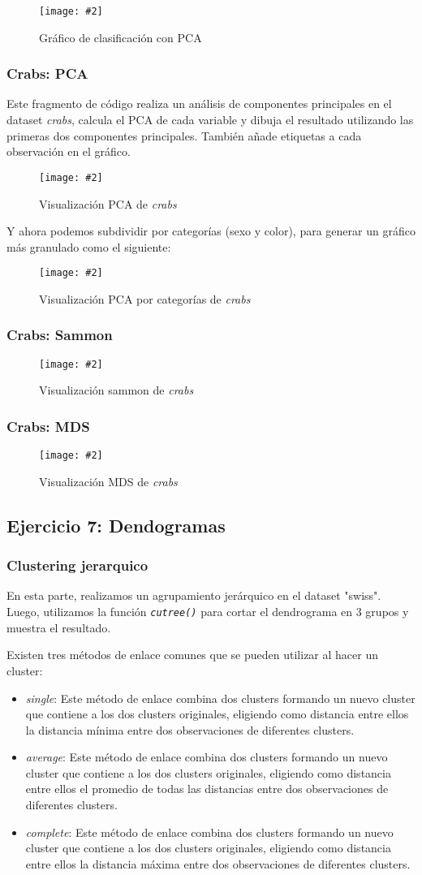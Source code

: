 \documentclass[
12pt, 
spanish, 
singlespacing,
headsepline
]{article}
\newcommand{\image}[2]{
\begin{figure}[H]
	\caption{#1}
	\centering
	\texttt{[image: \#2]}
\end{figure}
}
\newcommand{\smallimage}[2]{
\begin{figure}[H]
	\caption{#1}
	\centering
	\texttt{[image: \#2]}
\end{figure}
}
\newcommand{\code}[1]{\textit{\texttt{#1}}}
\begin{document}
\smallimage{Gráfico de clasificación con PCA}{R/svc.png}

\subsubsection{Crabs: PCA}
Este fragmento de código realiza un análisis de componentes principales en el dataset \emph{crabs}, calcula el PCA de cada variable y dibuja el resultado utilizando las primeras dos componentes principales. También añade etiquetas a cada observación en el gráfico.

\image{Visualización PCA de \emph{crabs}}{R/bob.png}

Y ahora podemos subdividir por categorías (sexo y color), para generar un gráfico más granulado como el siguiente:

\image{Visualización PCA por categorías de \emph{crabs}}{R/more_crabs.png}

\subsubsection{Crabs: Sammon}

\smallimage{Visualización sammon de \emph{crabs}}{R/sammon.png}

\subsubsection{Crabs: MDS}
\smallimage{Visualización MDS de \emph{crabs}}{R/mds_crabs.png}

\subsection{Ejercicio 7: Dendogramas}
\subsubsection{Clustering jerarquico}
En esta parte, realizamos un agrupamiento jerárquico en el dataset "swiss". Luego, utilizamos la función \code{cutree()} para cortar el dendrograma en 3 grupos y muestra el resultado.

Existen tres métodos de enlace comunes que se pueden utilizar al hacer un cluster:
\begin{itemize}
\item \emph{single}: Este método de enlace combina dos clusters formando un nuevo cluster que contiene a los dos clusters originales, eligiendo como distancia entre ellos la distancia mínima entre dos observaciones de diferentes clusters.
\item \emph{average}: Este método de enlace combina dos clusters formando un nuevo cluster que contiene a los dos clusters originales, eligiendo como distancia entre ellos el promedio de todas las distancias entre dos observaciones de diferentes clusters.
\item \emph{complete}: Este método de enlace combina dos clusters formando un nuevo cluster que contiene a los dos clusters originales, eligiendo como distancia entre ellos la distancia máxima entre dos observaciones de diferentes clusters.
\end{itemize}
\end{document}
